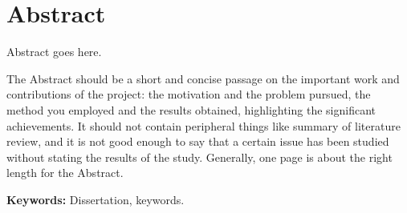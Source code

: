 \newpage
{}
\chapter*{\centering Abstract}
\begin{spacing}{1.5}
\setlength{\parskip}{0.3in}
\thispagestyle{addin}

Abstract goes here.

The Abstract should be a short and concise passage on the important work and contributions of the project: the motivation and the problem pursued, the method you employed and the results obtained, highlighting the significant achievements. It should not contain peripheral things like summary of literature review, and it is not good enough to say that a certain issue has been studied without stating the results of the study. Generally, one page is about the right length for the Abstract.

\par
\thispagestyle{addin} %
\textbf{Keywords:} Dissertation, keywords.
\end{spacing}
\newpage
